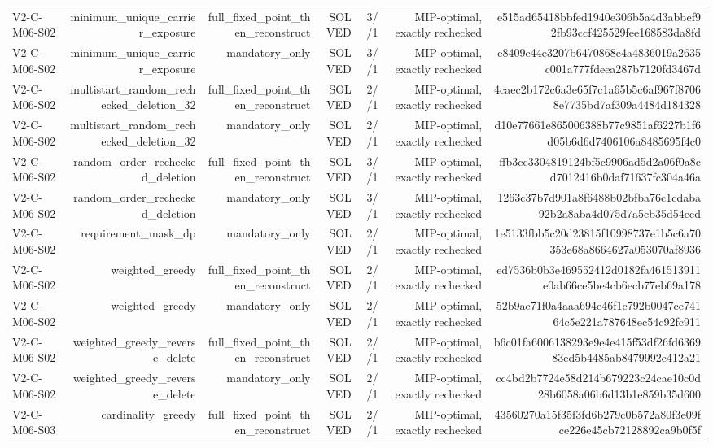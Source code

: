 {\begin{longtable}{lrrrrrr}
V2-C-M06-S02 & minimum\_unique\_carrier\_exposure & full\_fixed\_point\_then\_reconstruct & SOLVED & 3//1 & MIP-optimal, exactly rechecked & e515ad65418bbfed1940e306b5a4d3abbef92fb93ccf425529fee168583da8fd \\
V2-C-M06-S02 & minimum\_unique\_carrier\_exposure & mandatory\_only & SOLVED & 3//1 & MIP-optimal, exactly rechecked & e8409e44e3207b6470868e4a4836019a2635c001a777fdeea287b7120fd3467d \\
V2-C-M06-S02 & multistart\_random\_rechecked\_deletion\_32 & full\_fixed\_point\_then\_reconstruct & SOLVED & 2//1 & MIP-optimal, exactly rechecked & 4caec2b172c6a3e65f7c1a65b5c6af967f87068e7735bd7af309a4484d184328 \\
V2-C-M06-S02 & multistart\_random\_rechecked\_deletion\_32 & mandatory\_only & SOLVED & 2//1 & MIP-optimal, exactly rechecked & d10e77661e865006388b77c9851af6227b1f6d05b6d6d7406106a8485695f4c0 \\
V2-C-M06-S02 & random\_order\_rechecked\_deletion & full\_fixed\_point\_then\_reconstruct & SOLVED & 3//1 & MIP-optimal, exactly rechecked & ffb3cc3304819124bf5c9906ad5d2a06f0a8cd7012416b0daf71637fc304a46a \\
V2-C-M06-S02 & random\_order\_rechecked\_deletion & mandatory\_only & SOLVED & 3//1 & MIP-optimal, exactly rechecked & 1263c37b7d901a8f6488b02bfba76c1cdaba92b2a8aba4d075d7a5cb35d54eed \\
V2-C-M06-S02 & requirement\_mask\_dp & mandatory\_only & SOLVED & 2//1 & MIP-optimal, exactly rechecked & 1e5133fbb5c20d23815f10998737e1b5c6a70353e68a8664627a053070af8936 \\
V2-C-M06-S02 & weighted\_greedy & full\_fixed\_point\_then\_reconstruct & SOLVED & 2//1 & MIP-optimal, exactly rechecked & ed7536b0b3e469552412d0182fa461513911e0ab66ce5be4cb6ecb77eb69a178 \\
V2-C-M06-S02 & weighted\_greedy & mandatory\_only & SOLVED & 2//1 & MIP-optimal, exactly rechecked & 52b9ae71f0a4aaa694e46f1c792b0047ce74164c5e221a787648ec54c92fc911 \\
V2-C-M06-S02 & weighted\_greedy\_reverse\_delete & full\_fixed\_point\_then\_reconstruct & SOLVED & 2//1 & MIP-optimal, exactly rechecked & b6c01fa6006138293e9e4e415f53df26fd636983ed5b4485ab8479992e412a21 \\
V2-C-M06-S02 & weighted\_greedy\_reverse\_delete & mandatory\_only & SOLVED & 2//1 & MIP-optimal, exactly rechecked & cc4bd2b7724e58d214b679223c24cae10c0d28b6058a06b6d13b1e859b35d600 \\
V2-C-M06-S03 & cardinality\_greedy & full\_fixed\_point\_then\_reconstruct & SOLVED & 2//1 & MIP-optimal, exactly rechecked & 43560270a15f35f3fd6b279c0b572a80f3e09fce226e45cb72128892ca9b0f5f \\

\end{longtable}}
